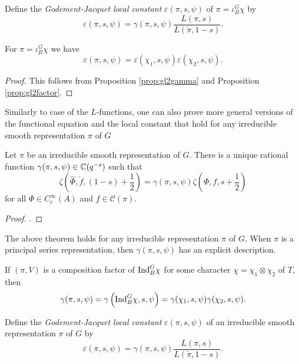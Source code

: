 \begin{defn}
    Define the \textit{Godement-Jacquet local constant} $\varepsilon(\pi,s,\psi)$ of $\pi = \iota_B^G \chi$ by 
    $$\varepsilon(\pi,s,\psi) = \gamma(\pi,s,\psi) \frac{L(\pi,s)}{L(\check{\pi},1-s)}.$$
\end{defn}

\begin{cor}
    For $\pi= \iota_B^G \chi$ we have
    $$\varepsilon(\pi,s,\psi) = \varepsilon(\chi_1,s,\psi)\varepsilon(\chi_2,s,\psi).$$
\end{cor}
\begin{proof}
    This follows from Proposition \ref{prop:gl2gamma} and Proposition \ref{prop:gl2factor}.
\end{proof}

Similarly to case of the $L$-functions, one can also prove more general versions of the functional equation and the local constant that hold for any irreducible smooth representation $\pi$ of $G$


\begin{thm}\label{BHThm2}
    Let $\pi$ be an irreducible smooth representation of $G$. There is a unique rational function $\gamma(\pi,s,\psi) \in \mathbb{C}(q^{-s})$ such that 
    $$\zeta\left(\hat\Phi,\check{f},(1-s)+\frac{1}{2}\right) = \gamma(\pi,s,\psi) \zeta\left(\Phi,f,s+\frac{1}{2}\right)$$ for all $\Phi \in C_c^\infty(A)$ and $f \in \mathcal C(\pi)$.
\end{thm}
\begin{proof}
    \cite[Theorem 24.2.2]{BH1}.
\end{proof}

The above theorem holds for any irreducible representation $\pi$ of $G$. When $\pi$ is a principal series representation, then $\gamma(\pi,s,\psi)$ has an explicit description.

\begin{lemma}
    If $(\pi,V)$ is a composition factor of $\mathrm{Ind}_B^G\chi$ for some character $\chi=\chi_1\otimes\chi_2$ of $T$, then
    $$\gamma(\pi,s,\psi)=\gamma\left(\mathrm{Ind}_B^G\chi,s,\psi\right)=\gamma(\chi_1,s,\psi)\gamma(\chi_2,s,\psi).$$
\end{lemma}



\begin{defn}
    Define the \textit{Godement-Jacquet local constant} $\varepsilon(\pi,s,\psi)$ of an irreducible smooth representation $\pi$ of $G$ by 
    $$\varepsilon(\pi,s,\psi) = \gamma(\pi,s,\psi) \frac{L(\pi,s)}{L(\check{\pi},1-s)}.$$
\end{defn}

